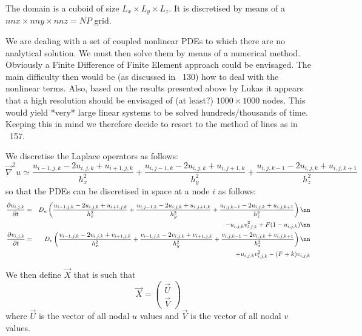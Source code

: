 The domain is a cuboid of size $L_x \times L_y \times L_z$.
It is discretised by means of a $nnx \times nny \times nnz = NP$ grid.

We are dealing with a set of coupled nonlinear PDEs to which there are no analytical solution.
We must then solve them by means of a numerical method. 
Obviously a Finite Difference of Finite Element approach could be envisaged. The main difficulty then
would be (as discussed in \stone~130) how to deal with the nonlinear terms. Also, based on 
the results presented above by Lukas it appears that a high resolution should be envisaged
of (at least?) $1000\times 1000$ nodes. This would yield *very* large linear systems to be 
solved hundreds/thousands of time.
Keeping this in mind we therefore decide to resort to the method of lines as in \stone~157.

We discretise the Laplace operators as follows:
\[
\vec\nabla^2 u \simeq 
\frac{u_{i-1,j,k}-2u_{i,j,k}+u_{i+1,j,k}}{h_x^2} + 
\frac{u_{i,j-1,k}-2u_{i,j,k}+u_{i,j+1,k}}{h_y^2} + 
\frac{u_{i,j,k-1}-2u_{i,j,k}+u_{i,j,k+1}}{h_z^2} 
\]
so that the PDEs can be discretised in space at a node $i$ as follows:
\begin{eqnarray}
\frac{\partial u_{i,j,k}}{\partial t} 
&=& D_u 
\left(
\frac{u_{i-1,j,k}-2u_{i,j,k}+u_{i+1,j,k}}{h_x^2} + 
\frac{u_{i,j-1,k}-2u_{i,j,k}+u_{i,j+1,k}}{h_y^2} + 
\frac{u_{i,j,k-1}-2u_{i,j,k}+u_{i,j,k+1}}{h_z^2} 
\right) \nn\\
&&- u_{i,j,k}v_{i,j,k}^2 + F(1-u_{i,j,k}) 
\nn\\
\frac{\partial v_{i,j,k}}{\partial t} &=& D_v 
\left(
\frac{v_{i-1,j,k}-2v_{i,j,k}+v_{i+1,j,k}}{h_x^2} + 
\frac{v_{i-1,j,k}-2v_{i,j,k}+v_{i+1,j,k}}{h_y^2} + 
\frac{v_{i,j,k-1}-2v_{i,j,k}+v_{i,j,k+1}}{h_z^2} 
\right) \nn\\
&&
+ u_{i,j,k}v_{i,j,k}^2 - (F+k)v_{i,j,k}
\end{eqnarray}

We then define $\vec{X}$ that is such that 
\[
\vec{X} = 
\left(
\begin{array}{c}
\vec{U} \\ \vec{V}
\end{array}
\right)
\] 
where $\vec{U}$ is the vector of all nodal $u$ values and 
$\vec{V}$ is the vector of all nodal $v$ values.

